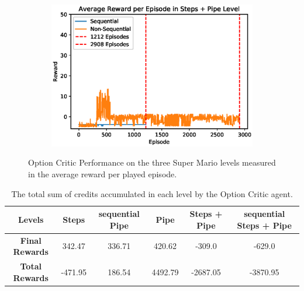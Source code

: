 \documentclass[notitlepage,a4paper,11pt]{article}
\begin{document}
\begin{figure}[htb!]
\begin{subfigure}[t]{0.32\textwidth}
         \includegraphics[width=\textwidth]{figs/oc_results_3.eps}
         \caption{}
         \label{fig:oc_results_3}
     \end{subfigure}
        \caption{Option Critic Performance on the three Super Mario levels measured in the average reward per played episode.}
        \label{fig:oc_results}
\end{figure}

\begin{table}[htb!]
\centering
\begin{tabular}{ |c|c|c|c|c|c| } 
	\hline
	\textbf{Levels} & Steps & sequential Pipe  & Pipe & Steps + Pipe & sequential Steps + Pipe \\
	\hline
	\textbf{Final Rewards} & 342.47 & 336.71 & 420.62 & -309.0 & -629.0\\
	\hline
	\textbf{Total Rewards} & -471.95 & 186.54 & 4492.79 &  -2687.05 & -3870.95 \\
	\hline
\end{tabular}
\caption{The total sum of credits accumulated in each level by the Option Critic agent.}
\label{tbl:oc_rewards}
\end{table}
\end{document}
